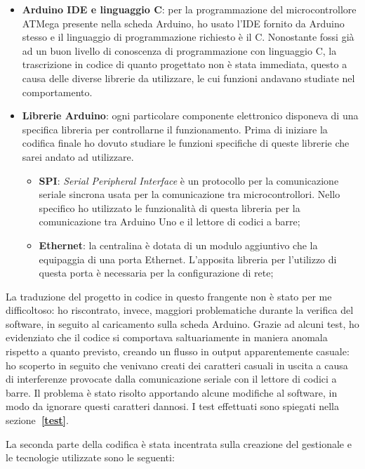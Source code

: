 \begin{itemize}
\item \textbf{Arduino IDE e linguaggio C}: per la programmazione del microcontrollore ATMega presente nella scheda Arduino, ho usato l'IDE fornito da Arduino stesso e il linguaggio di programmazione richiesto è il C. Nonostante fossi già ad un buon livello di conoscenza di programmazione con linguaggio C, la trascrizione in codice di quanto progettato non è stata immediata, questo a causa delle diverse librerie da utilizzare, le cui funzioni andavano studiate nel comportamento.
\item \textbf{Librerie Arduino}: ogni particolare componente elettronico disponeva di una specifica libreria per controllarne il funzionamento. Prima di iniziare la codifica finale ho dovuto studiare le funzioni specifiche di queste librerie che sarei andato ad utilizzare.
\begin{itemize}
	\item \textbf{SPI}: \textit{Serial Peripheral Interface} è un protocollo per la comunicazione seriale sincrona usata per la comunicazione tra microcontrollori. Nello specifico ho utilizzato le funzionalità di questa libreria per la comunicazione tra Arduino Uno e il lettore di codici a barre;
	\item \textbf{Ethernet}: la centralina è dotata di un modulo aggiuntivo che la equipaggia di una porta Ethernet. L'apposita libreria per l'utilizzo di questa porta è necessaria per la configurazione di rete;
	
\end{itemize}
\end{itemize}

La traduzione del progetto in codice in questo frangente non è stato per me difficoltoso: ho riscontrato, invece, maggiori problematiche durante la verifica del software, in seguito al caricamento sulla scheda Arduino. Grazie ad alcuni test, ho evidenziato che il codice si comportava saltuariamente in maniera anomala rispetto a quanto previsto, creando un flusso in output apparentemente casuale: ho scoperto in seguito che venivano creati dei caratteri casuali in uscita a causa di interferenze provocate dalla comunicazione seriale con il lettore di codici a barre. Il problema è stato risolto apportando alcune modifiche al software, in modo da ignorare questi caratteri dannosi. I test effettuati sono spiegati nella sezione\textbf{~\ref{test}}.

\medskip

La seconda parte della codifica è stata incentrata sulla creazione del gestionale e le tecnologie utilizzate sono le seguenti:

